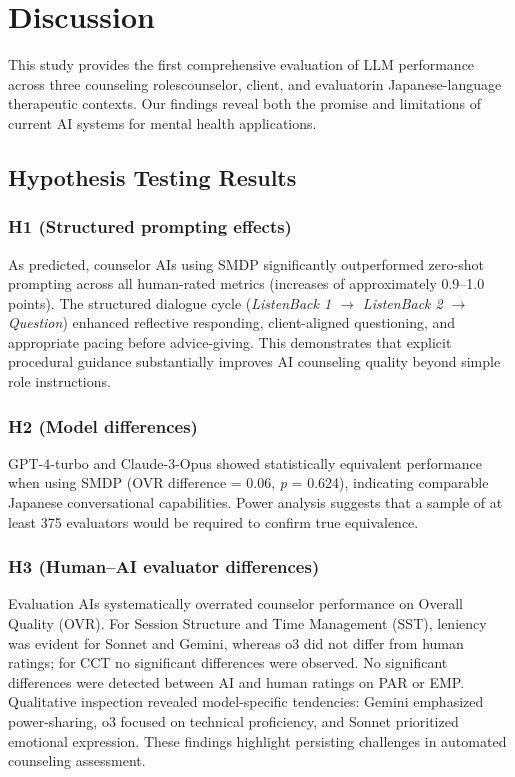 \documentclass{wiley-article}
\begin{document}

\section*{Discussion}

This study provides the first comprehensive evaluation of LLM performance across three counseling roles\textemdash{}counselor, client, and evaluator\textemdash{}in Japanese-language therapeutic contexts. Our findings reveal both the promise and limitations of current AI systems for mental health applications.

\subsection*{Hypothesis Testing Results}

\subsubsection*{H1 (Structured prompting effects)}
As predicted, counselor AIs using SMDP significantly outperformed zero-shot prompting across all human-rated metrics (increases of approximately 0.9–1.0 points). The structured dialogue cycle (\emph{Listen\textendash{}Back 1 $\rightarrow$ Listen\textendash{}Back 2 $\rightarrow$ Question}) enhanced reflective responding, client-aligned questioning, and appropriate pacing before advice-giving. This demonstrates that explicit procedural guidance substantially improves AI counseling quality beyond simple role instructions.

\subsubsection*{H2 (Model differences)}
GPT-4-turbo and Claude-3-Opus showed statistically equivalent performance when using SMDP (OVR difference = 0.06, \emph{p} = 0.624), indicating comparable Japanese conversational capabilities. Power analysis suggests that a sample of at least 375 evaluators would be required to confirm true equivalence.

\subsubsection*{H3 (Human–AI evaluator differences)}
Evaluation AIs systematically overrated counselor performance on Overall Quality (OVR). For Session Structure and Time Management (SST), leniency was evident for Sonnet and Gemini, whereas o3 did not differ from human ratings; for CCT no significant differences were observed. No significant differences were detected between AI and human ratings on PAR or EMP. Qualitative inspection revealed model-specific tendencies: Gemini emphasized power-sharing, o3 focused on technical proficiency, and Sonnet prioritized emotional expression. These findings highlight persisting challenges in automated counseling assessment.
\end{document}
